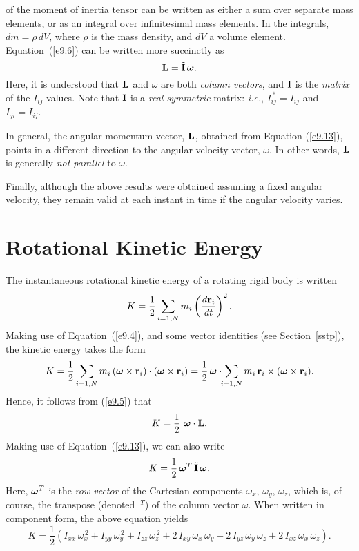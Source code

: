 of the moment of inertia tensor can be written as either a sum over separate
mass elements, or as an integral over infinitesimal mass elements.
In the integrals, $dm = \rho\,dV$, where $\rho$ is the mass density, and 
$dV$ a volume element.
Equation~(\ref{e9.6}) can be written more succinctly as
\begin{equation}\label{e9.13}
{\bf L} = \tilde{\bf I}\,\mbox{\boldmath$\omega$}.
\end{equation}
Here, it is understood that ${\bf L}$ and \mbox{\boldmath$\omega$} are
both {\em column vectors}, and $\tilde{\bf I}$ is the {\em matrix}\/ of the $I_{ij}$ values.
Note that $\tilde{\bf I}$ is a {\em real symmetric}\/ matrix:
{\em i.e.}, $I_{ij}^{\,\ast} = I_{ij}$ and $I_{ji} = I_{ij}$. 

In general, 
the angular momentum vector, ${\bf L}$, obtained from Equation (\ref{e9.13}),
points in a different direction to the angular velocity vector, \mbox{\boldmath$\omega$}. In other words, ${\bf L}$
is generally {\em not parallel}\/ to \mbox{\boldmath$\omega$}.

Finally, although the above results  were obtained assuming a
fixed angular velocity, they remain valid at each instant in time if the angular velocity varies.

\section{Rotational Kinetic Energy}
The instantaneous rotational kinetic energy of a rotating rigid body is written
\begin{equation}
K = \frac{1}{2}\sum_{i=1,N} m_i\left(\frac{d{\bf r}_i}{dt}\right)^2.
\end{equation}
Making use of Equation~(\ref{e9.4}), and some vector identities (see Section~\ref{sstp}),
the kinetic energy takes the form
\begin{equation}
K = \frac{1}{2}\sum_{i=1,N} m_i\,(\mbox{\boldmath$\omega$}\times
{\bf r}_i)\cdot(\mbox{\boldmath$\omega$}\times
{\bf r}_i) = \frac{1}{2}\,\mbox{\boldmath$\omega$} \cdot\!\! \sum_{i=1,N} 
m_i\,{\bf r}_i\times (\mbox{\boldmath$\omega$}\times {\bf r}_i).
\end{equation}
Hence, it follows from (\ref{e9.5}) that
\begin{equation}\label{e9.16}
K = \frac{1}{2}\,\, \mbox{\boldmath$\omega$} \cdot {\bf L}.
\end{equation}
Making use of Equation~(\ref{e9.13}), we can also
write
\begin{equation}\label{e9.17}
K = \frac{1}{2}\,\mbox{\boldmath$\omega$}^T\,\tilde{\bf I}\,\mbox{\boldmath$\omega$}.
\end{equation}
Here, $\mbox{\boldmath$\omega$}^T$ is the {\em row vector}\/ of the Cartesian components
$\omega_x$, $\omega_y$, $\omega_z$, which is, of course, the transpose
(denoted $~^T$) of the column vector \mbox{\boldmath$\omega$}.
When written in component form, the above equation yields
\begin{equation}\label{e9.18}
K = \frac{1}{2}\left(I_{xx}\,\omega_x^{\,2}+ I_{yy}\,\omega_y^{\,2}+I_{zz}\,\omega_z^{\,2} + 2\,I_{xy}\,\omega_x\,\omega_y + 2\,I_{yz}\,\omega_y\,\omega_z + 2\,I_{xz}\,\omega_x\,\omega_z\right).
\end{equation}

